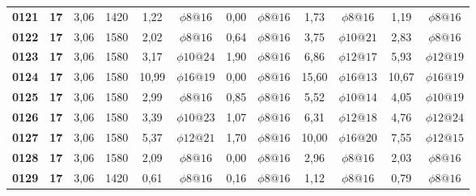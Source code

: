 \begin{table}[H]
{\begin{tabular}{|c|c|c|c|c|c|c|c|c|c|c|c|}
        \textbf{0121} & \textbf{17} & 3,06  & 1420  & 1,22  & $\phi8@16$ & 0,00  & $\phi8@16$ & 1,73  & $\phi8@16$ & 1,19  & $\phi8@16$ \\
        \textbf{0122} & \textbf{17} & 3,06  & 1580  & 2,02  & $\phi8@16$ & 0,64  & $\phi8@16$ & 3,75  & $\phi10@21$ & 2,83  & $\phi8@16$ \\
        \textbf{0123} & \textbf{17} & 3,06  & 1580  & 3,17  & $\phi10@24$ & 1,90  & $\phi8@16$ & 6,86  & $\phi12@17$ & 5,93  & $\phi12@19$ \\
        \textbf{0124} & \textbf{17} & 3,06  & 1580  & 10,99 & $\phi16@19$ & 0,00  & $\phi8@16$ & 15,60 & $\phi16@13$ & 10,67 & $\phi16@19$ \\
        \textbf{0125} & \textbf{17} & 3,06  & 1580  & 2,99  & $\phi8@16$ & 0,85  & $\phi8@16$ & 5,52  & $\phi10@14$ & 4,05  & $\phi10@19$ \\
        \textbf{0126} & \textbf{17} & 3,06  & 1580  & 3,39  & $\phi10@23$ & 1,07  & $\phi8@16$ & 6,31  & $\phi12@18$ & 4,76  & $\phi12@24$ \\
        \textbf{0127} & \textbf{17} & 3,06  & 1580  & 5,37  & $\phi12@21$ & 1,70  & $\phi8@16$ & 10,00 & $\phi16@20$ & 7,55  & $\phi12@15$ \\
        \textbf{0128} & \textbf{17} & 3,06  & 1580  & 2,09  & $\phi8@16$ & 0,00  & $\phi8@16$ & 2,96  & $\phi8@16$ & 2,03  & $\phi8@16$ \\
        \textbf{0129} & \textbf{17} & 3,06  & 1420  & 0,61  & $\phi8@16$ & 0,16  & $\phi8@16$ & 1,12  & $\phi8@16$ & 0,79  & $\phi8@16$ \bigstrut[b]\\
        \hline
    \end{tabular}%
        }
        \label{resumenlosas-1}%
    \end{table}%

